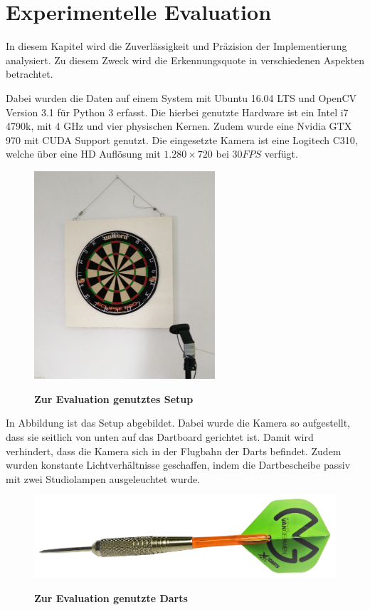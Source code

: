 
\chapter{Experimentelle Evaluation}
\label{chap:evaluation}
In diesem Kapitel wird die Zuverlässigkeit und Präzision der Implementierung analysiert. Zu diesem Zweck wird die Erkennungsquote in verschiedenen Aspekten betrachtet.

Dabei wurden die Daten auf einem System mit Ubuntu 16.04 LTS und OpenCV Version 3.1 für Python 3 erfasst. Die hierbei genutzte Hardware ist ein Intel i7 4790k, mit 4 GHz und vier physischen Kernen. Zudem wurde eine Nvidia GTX 970 mit CUDA Support genutzt.
Die eingesetzte Kamera ist eine Logitech C310, welche über eine HD Auflösung mit  $1.280\times720$ bei $30FPS$ verfügt. 

\begin{figure}[ht]
\centering
\includegraphics[width=0.6\textwidth]{media/testsetup}\\
\caption{\textbf{Zur Evaluation genutztes Setup}}
\label{Fig:testsetup}
\end{figure}
In Abbildung  ist das Setup abgebildet. Dabei wurde die Kamera so aufgestellt, dass sie seitlich von unten auf das Dartboard gerichtet ist. Damit wird verhindert, dass die Kamera sich in der Flugbahn der Darts befindet. Zudem wurden konstante Lichtverhältnisse geschaffen, indem die Dartbescheibe passiv mit zwei Studiolampen ausgeleuchtet wurde.
\begin{figure}[ht]
\centering
\includegraphics[width=\textwidth]{media/MyDart.png}\\
\caption{\textbf{Zur Evaluation genutzte Darts}}
\label{Fig:mydart}
\end{figure}

